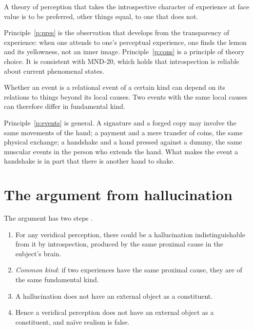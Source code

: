\documentclass{situationist-preprint}
\begin{document}
\begin{principle}\label{p:cons}
A theory of perception that takes the introspective character of experience at face value is to be preferred, other things equal, to one that does not.
\end{principle}

Principle~\ref{p:pres} is the observation that \citet{Martin2002} develops from the transparency of experience: when one attends to one's perceptual experience, one finds the lemon and its yellowness, not an inner image. Principle~\ref{p:cons} is a principle of theory choice. It is consistent with MND-20, which holds that introspection is reliable about current phenomenal states.

\begin{principle}\label{p:events}
Whether an event is a relational event of a certain kind can depend on its relations to things beyond its local causes. Two events with the same local causes can therefore differ in fundamental kind.
\end{principle}

Principle~\ref{p:events} is general. A signature and a forged copy may involve the same movements of the hand; a payment and a mere transfer of coins, the same physical exchange; a handshake and a hand pressed against a dummy, the same muscular events in the person who extends the hand. What makes the event a handshake is in part that there is another hand to shake.

\section{The argument from hallucination}

The argument has two steps \citep{Robinson1994,Martin2004}.

\begin{enumerate}
\item[(A1)] For any veridical perception, there could be a hallucination indistinguishable from it by introspection, produced by the same proximal cause in the subject's brain.
\item[(A2)] \emph{Common kind}: if two experiences have the same proximal cause, they are of the same fundamental kind.
\item[(A3)] A hallucination does not have an external object as a constituent.
\item[(C)] Hence a veridical perception does not have an external object as a constituent, and naïve realism is false.
\end{enumerate}
\end{document}
